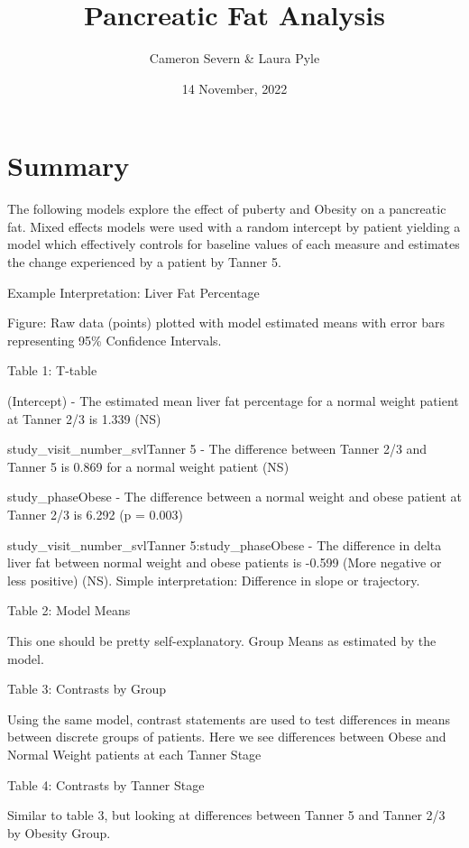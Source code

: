 \documentclass[
]{article}
\title{Pancreatic Fat Analysis}
\author{Cameron Severn \& Laura Pyle}
\date{14 November, 2022}
\begin{document}
\maketitle

{
\setcounter{tocdepth}{2}
\tableofcontents
}
\hypertarget{summary}{%
\section{Summary}\label{summary}}

The following models explore the effect of puberty and Obesity on a
pancreatic fat. Mixed effects models were used with a random intercept
by patient yielding a model which effectively controls for baseline
values of each measure and estimates the change experienced by a patient
by Tanner 5.

Example Interpretation: Liver Fat Percentage

Figure: Raw data (points) plotted with model estimated means with error
bars representing 95\% Confidence Intervals.

Table 1: T-table

(Intercept) - The estimated mean liver fat percentage for a normal
weight patient at Tanner 2/3 is 1.339 (NS)

study\_visit\_number\_svlTanner 5 - The difference between Tanner 2/3
and Tanner 5 is 0.869 for a normal weight patient (NS)

study\_phaseObese - The difference between a normal weight and obese
patient at Tanner 2/3 is 6.292 (p = 0.003)

study\_visit\_number\_svlTanner 5:study\_phaseObese - The difference in
delta liver fat between normal weight and obese patients is -0.599 (More
negative or less positive) (NS). Simple interpretation: Difference in
slope or trajectory.

Table 2: Model Means

This one should be pretty self-explanatory. Group Means as estimated by
the model.

Table 3: Contrasts by Group

Using the same model, contrast statements are used to test differences
in means between discrete groups of patients. Here we see differences
between Obese and Normal Weight patients at each Tanner Stage

Table 4: Contrasts by Tanner Stage

Similar to table 3, but looking at differences between Tanner 5 and
Tanner 2/3 by Obesity Group.
\end{document}
